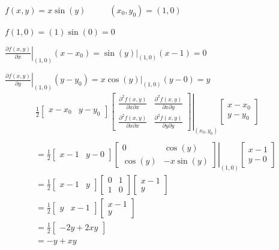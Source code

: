 \documentclass[
  letterpaper,
  DIV=11,
  numbers=noendperiod]{scrreprt}
\begin{document}
\(f(x,y) = x \sin(y) \phantom{---} (x_0,y_0) = (1,0)\)

\(f(1,0) = (1) \sin(0) = 0\)

\(\left. \frac{\partial f(x,y)}{\partial x} \right |_{(1,0)} (x-x_0) = \left. \sin(y) \right |_{(1,0)}(x-1)=0\)

\(\left. \frac{\partial f(x,y)}{\partial y} \right |_{(1,0)} (y-y_0) = \left.  x\cos(y) \right |_{(1,0)}(y-0)=y\)
\[
\begin{aligned}
& \frac{1}{2} \begin{bmatrix} x-x_0 & y-y_0 \end{bmatrix}
\left. \begin{bmatrix} \frac{\partial^2{f(x,y)}}{\partial{x}\partial{x}} & \frac{\partial^2{f(x,y)}}{\partial{x}\partial{y}}\\ 
      \frac{\partial^2{f(x,y)}}{\partial{x}\partial{x}} & \frac{\partial^2{f(x,y)}}{\partial{y}\partial{y}} \end{bmatrix}
      \right |_{(x_0,y_0)}
\begin{bmatrix} x-x_0 \\ y-y_0 \end{bmatrix} & \\ \\
& = \frac{1}{2} \begin{bmatrix} x-1 & y-0 \end{bmatrix}
\left. \begin{bmatrix} 0 & \cos(y)\\ 
           \cos(y) & -x \sin(y) \end{bmatrix}
           \right |_{(1,0)}
\begin{bmatrix} x-1 \\ y-0 \end{bmatrix} & \\
& = \frac{1}{2} \begin{bmatrix} x-1 & y \end{bmatrix}
\begin{bmatrix} 0 & 1 \\ 1 & 0 \end{bmatrix}
\begin{bmatrix} x-1 \\ y \end{bmatrix} & \\
& = \frac{1}{2} \begin{bmatrix} y & x-1 \end{bmatrix}
\begin{bmatrix} x-1 \\ y \end{bmatrix} & \\
& = \frac{1}{2} \begin{bmatrix} -2y+2xy \end{bmatrix} &\\
& = -y+xy &
\end{aligned}
\]
\end{document}
